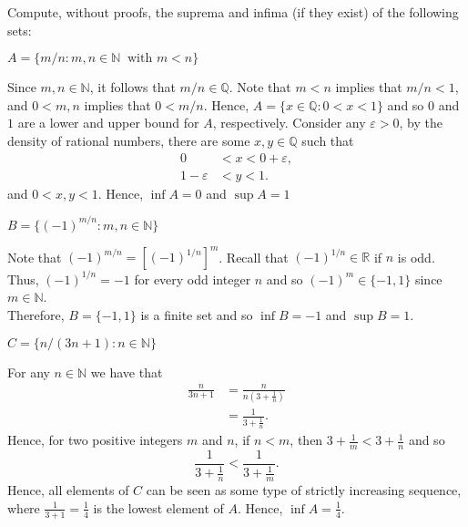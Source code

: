\documentclass[12pt]{article}
\newcommand{\N}{\mathbb{N}}
\newcommand{\R}{\mathbb{R}}
\newcommand{\Q}{\mathbb{Q}}
\newenvironment{problem}[2][Problem]{\begin{trivlist}
		\item[\hskip \labelsep {\bfseries #1}\hskip \labelsep {\bfseries #2.}]}{\end{trivlist}}
\newenvironment{solution}[2][Solution]{\begin{trivlist}
		\item[\hskip \labelsep {\bfseries #1}\hskip \labelsep {\bfseries #2.}]}{\end{trivlist}}
\begin{document}
		\begin{problem}{1.3.8}
			Compute, without proofs, the suprema and infima (if they exist) of the following sets:
			\begin{enumerate}[label=(\alph*)]
				\item $A=\{m/n:m,n\in \N\ \text{ with }m<n\}$
				\begin{solution}{(a)}
					Since $m,n\in \N$, it follows that $m/n \in \Q$. Note that $m<n$ implies that $m/n < 1$, and $0<m,n$ implies that $0< m/n$.  Hence, $A=\{x\in \Q: 0<x<1\}$ and so $0$ and $1$ are a lower and upper bound for $A$, respectively. Consider any $\varepsilon>0$, by the density of rational numbers, there are some $x,y\in \Q$ such that 
					\begin{align*}
						0&<x<0+\varepsilon,\\ 1-\varepsilon&<y<1.
					\end{align*}
					and $0<x,y<1$. Hence, $\inf A= 0$ and $\sup A = 1$
				\end{solution}
				\item $B=\{(-1)^{m/n}:m,n\in \N\}$
				\begin{solution}{(b)}
				 Note that $(-1)^{m/n} = \left[(-1)^{1/n}\right]^{m}$. Recall that $(-1)^{1/n} \in \R$ if $n$ is odd. Thus, $(-1)^{1/n} = -1$ for every odd integer $n$ and so $(-1)^{m} \in \{-1,1\}$ since $m\in \N$. \\
					Therefore, $B=\{-1,1\}$ is a finite set and so $\inf B = -1$ and $\sup B = 1$.
				\end{solution}
				\item $C=\{n/(3n+1):n\in \N\}$
				\begin{solution}{(c)}
				 For any $n\in \N$ we have that
					\begin{align*}
						\frac{n}{3n+1} &= \frac{n}{n\left(3+\frac{1}{n}\right)}\\
						&= \frac{1}{3+\frac{1}{n}}.
					\end{align*}
				Hence, for two positive integers $m$ and $n$, if $n<m$, then $3+\frac{1}{m}<3+\frac{1}{n}$ and so 
				\begin{equation*}
					\frac{1}{3+\frac{1}{n}}<	\frac{1}{3+\frac{1}{m}}.
				\end{equation*}
			Hence, all elements of $C$ can be seen as some type of strictly increasing sequence, where $\frac{1}{3+1} = \frac{1}{4}$ is the lowest element of $A$. Hence, $\inf A = \frac{1}{4}$.\\
			

\end{solution}
\end{enumerate}
\end{problem}
\end{document}

